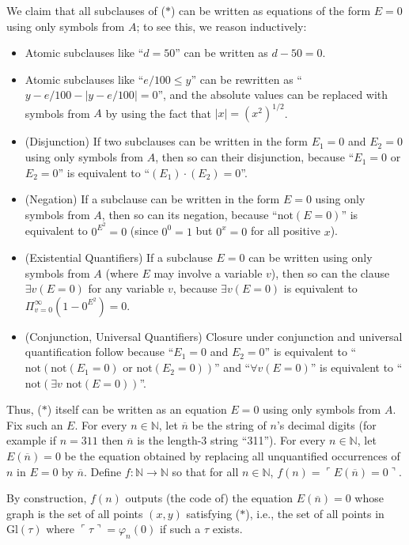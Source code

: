 \documentclass[table, svgnames, dvipsnames, letterpaper, 11pt]{report}
\theoremstyle{remark}
\begin{document}
We claim that all subclauses of ($*$) can be written as equations
of the form $E=0$ using only symbols from $A$; to see this, we reason
inductively:
\begin{itemize}
  \item
  Atomic subclauses like ``$d=50$'' can be written
  as $d-50=0$.
  \item
  Atomic subclauses like ``$e/100\leq y$'' can be rewritten as
  ``$y-e/100-|y-e/100|=0$'', and the absolute values can be
  replaced with symbols from $A$ by using the fact that
  $|x|=(x^2)^{1/2}$.
  \item
  (Disjunction)
  If two subclauses can be written in the form $E_1=0$ and $E_2=0$
  using only symbols from $A$, then so can their disjunction, because
  ``$E_1=0$ or $E_2=0$'' is equivalent to ``$(E_1)\cdot (E_2)=0$''.
  \item
  (Negation)
  If a subclause can be written in the form $E=0$ using only symbols
  from $A$, then so can its negation, because ``$\mbox{not}(E=0)$''
  is equivalent to $0^{E^2}=0$ (since $0^0=1$ \cite{knuth1992two}
  but $0^x=0$ for all positive
  $x$).
  \item
  (Existential Quantifiers)
  If a subclause $E=0$ can be written using only symbols from $A$
  (where $E$ may involve a variable $v$),
  then so can the clause $\exists v (E=0)$ for any variable $v$,
  because $\exists v (E=0)$ is equivalent to
  $\Pi_{v=0}^\infty (1-0^{E^2})=0$.
  \item
  (Conjunction, Universal Quantifiers)
  Closure under conjunction and universal quantification follow because
  ``$E_1=0$ and $E_2=0$'' is equivalent to
  ``$\mbox{not}(\mbox{not}(E_1=0)\mbox{ or }\mbox{not}(E_2=0))$''
  and ``$\forall v (E=0)$'' is equivalent to
  ``$\mbox{not}(\exists v \mbox{ not}(E=0))$''.
\end{itemize}

Thus, ($*$) itself can be written as an equation $E=0$ using only symbols
from $A$. Fix such an $E$.
For every $n\in\mathbb N$, let $\overline{n}$ be the string of $n$'s
decimal digits (for example if $n=311$ then $\overline{n}$ is the length-$3$
string ``311''). For every $n\in\mathbb N$, let $E(\overline n)=0$ be the equation
obtained by replacing all unquantified occurrences of $n$ in $E=0$
by $\overline{n}$. Define $f:\mathbb N\to\mathbb N$ so that
for all $n\in\mathbb N$, $f(n)=\ulcorner E(\overline n)=0\urcorner$.

By construction, $f(n)$ outputs (the code of) the equation $E(\overline n)=0$
whose graph is the set of all points $(x,y)$ satisfying ($*$),
i.e., the set of all points in $\mathrm{Gl}(\tau)$ where
$\ulcorner\tau\urcorner=\varphi_n(0)$ if such a $\tau$ exists.
\end{document}
